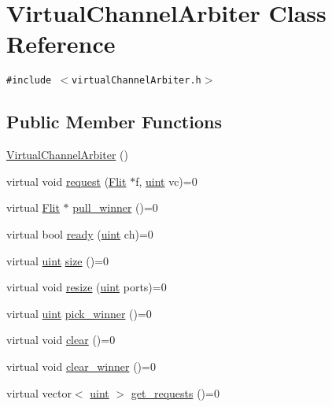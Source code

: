 \hypertarget{classVirtualChannelArbiter}{
\section{VirtualChannelArbiter Class Reference}
\label{classVirtualChannelArbiter}
}
{\tt \#include $<$virtualChannelArbiter.h$>$}

\subsection*{Public Member Functions}
\begin{CompactItemize}
\item 
\hyperlink{classVirtualChannelArbiter_ceadea036b8d216d8b5a52b40d11daf3}{VirtualChannelArbiter} ()
\item 
virtual void \hyperlink{classVirtualChannelArbiter_ecb14402319f140f7dc422d03e21ca48}{request} (\hyperlink{classFlit}{Flit} $\ast$f, \hyperlink{outputBuffer_8h_91ad9478d81a7aaf2593e8d9c3d06a14}{uint} vc)=0
\item 
virtual \hyperlink{classFlit}{Flit} $\ast$ \hyperlink{classVirtualChannelArbiter_f2e766f8a79745120e3a4666c03d6e6b}{pull\_\-winner} ()=0
\item 
virtual bool \hyperlink{classVirtualChannelArbiter_97962f6205f940bdcfa533cdcc6d8e9d}{ready} (\hyperlink{outputBuffer_8h_91ad9478d81a7aaf2593e8d9c3d06a14}{uint} ch)=0
\item 
virtual \hyperlink{outputBuffer_8h_91ad9478d81a7aaf2593e8d9c3d06a14}{uint} \hyperlink{classVirtualChannelArbiter_f712fea20cab6cb57b5a1ed43fc2d3c8}{size} ()=0
\item 
virtual void \hyperlink{classVirtualChannelArbiter_6bb7faf3f8928b51f78f2a8c9179b2eb}{resize} (\hyperlink{outputBuffer_8h_91ad9478d81a7aaf2593e8d9c3d06a14}{uint} ports)=0
\item 
virtual \hyperlink{outputBuffer_8h_91ad9478d81a7aaf2593e8d9c3d06a14}{uint} \hyperlink{classVirtualChannelArbiter_8263fcfa1de7131c6ee205b461ee0841}{pick\_\-winner} ()=0
\item 
virtual void \hyperlink{classVirtualChannelArbiter_b1de3a733e3a17d6da028e72fe921f0c}{clear} ()=0
\item 
virtual void \hyperlink{classVirtualChannelArbiter_5033871e1f5355b8bf0d3f319a449954}{clear\_\-winner} ()=0
\item 
virtual vector$<$ \hyperlink{outputBuffer_8h_91ad9478d81a7aaf2593e8d9c3d06a14}{uint} $>$ \hyperlink{classVirtualChannelArbiter_1aadf26d1312ccbe970253b83f67cf2c}{get\_\-requests} ()=0
\end{CompactItemize}


